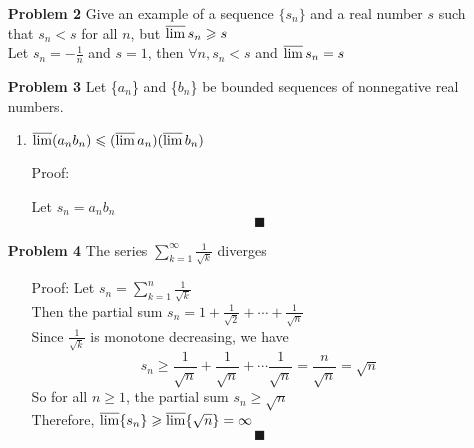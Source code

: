 \documentclass[a4paper,12pt]{report}
\begin{document}
\begin{enumerate}
\begin{enumerate}
	\end{enumerate}

\item[\bf{Problem 2}] Give an example of a sequence $\{s_n\}$ and a real number $s$ such that $s_n < s$ for all $n$, but $\varlimsup s_n \geqslant s$ \\
	Let $s_n = -\frac{1}{n}$ and $s = 1$, then $\forall n, s_n < s$ and $\varlimsup s_n = s$
	
\item[\bf{Problem 3}] Let \{$a_n$\} and \{$b_n$\} be bounded sequences of nonnegative real numbers.
	\begin{enumerate}
	\item $\varlimsup(a_n b_n) \leqslant (\varlimsup a_n)(\varlimsup b_n)$ \\
	
	\item[Proof:]
	
	Let $s_n = a_n b_n$
	\[\blacksquare\]
	\end{enumerate}
	
\item[\bf{Problem 4}] The series $\sum\limits_{k=1}^{\infty} \frac{1}{\sqrt{k}}$ diverges
	\begin{enumerate}
	\item[Proof:] Let $s_n = \sum\limits_{k=1}^{n} \frac{1}{\sqrt{k}}$ \\
	Then the partial sum $s_n = 1 + \frac{1}{\sqrt{2}} + \cdots + \frac{1}{\sqrt{n}}$ \\
	Since $\frac{1}{\sqrt{k}}$ is monotone decreasing, we have
	\[
		s_n \geqslant 
		\frac{1}{\sqrt{n}} + \frac{1}{\sqrt{n}} + \cdots \frac{1}{\sqrt{n}}
		= \frac{n}{\sqrt{n}} = \sqrt{n}
	\]
	So for all $n \geqslant 1$, the partial sum $s_n \geqslant \sqrt{n}$ \\
	Therefore, $\varlimsup\{s_n\} \geqslant \varlimsup\{\sqrt{n}\} = \infty$ 
	\[\blacksquare\]
	\end{enumerate}

\end{enumerate}
\end{document}
